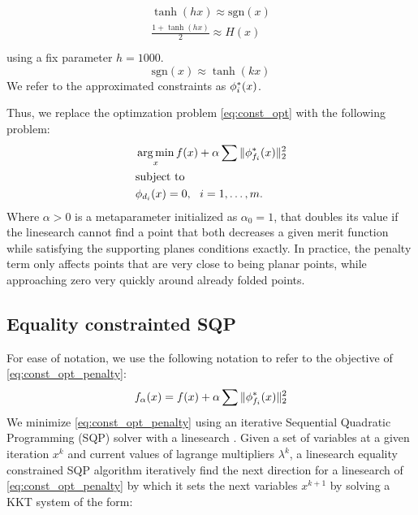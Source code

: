 \begin{align} 
\begin{split}\label{eq:const_inner}
\tanh(hx) \approx \text{sgn}(x) \\
\frac{1+\tanh(hx)}{2} \approx H(x)\\
\end{split}
\end{align}
using a fix parameter $h=1000$.
\begin{equation}
\text{sgn}(x) \approx \tanh(kx)
\end{equation}
We refer to the approximated constraints as $\phi^*_i(x)$.

Thus, we replace the optimzation problem \eqref{eq:const_opt} with the following problem:
\begin{equation} \label{eq:const_opt_penalty}
\begin{aligned}
& \operatorname*{arg\,min}_x f(x) + \alpha \sum \|\phi^*_{f_i}(x)\|_2^2 \\
& \textrm{subject to} \\
& \phi_{d_i}(x) = 0, \ \  i = 1, \ldots, m. \\ 
\end{aligned}
\end{equation}
Where $\alpha > 0$ is a metaparameter initialized as $\alpha_0 = 1$, that doubles its value if the linesearch cannot find a point that both decreases a given merit function while satisfying the supporting planes conditions exactly. In practice, the penalty term only affects points that are very close to being planar points, while approaching zero very quickly around already folded points.

\subsection{Equality constrainted SQP}
For ease of notation, we use the following notation to refer to the objective of \eqref{eq:const_opt_penalty}:
\begin{equation}
f_\alpha(x) = f(x) + \alpha \sum \|\phi^*_{f_i}(x)\|_2^2
\end{equation}
We minimize \eqref{eq:const_opt_penalty} using an iterative Sequential Quadratic Programming (SQP) solver with a linesearch \cite{nocedal}. Given a set of variables at a given iteration $x^k$ and current values of lagrange multipliers $\lambda^k$, a linesearch equality constrained SQP algorithm iteratively find the next direction for a linesearch of \eqref{eq:const_opt_penalty} by which it sets the next variables $x^{k+1}$ by solving a KKT system of the form:

